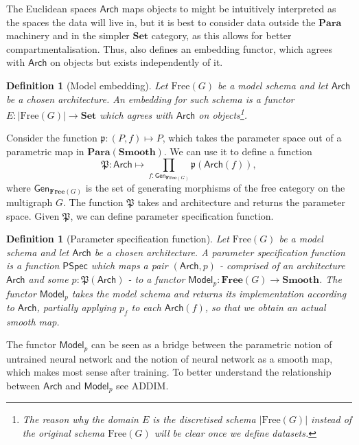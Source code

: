 \documentclass[12pt,a4paper,openright,twoside]{report}
\theoremstyle{plain}
\newtheorem{definition}[proposition]{Definition}
\theoremstyle{definition}
\begin{document}
The Euclidean spaces $\mathsf{Arch}$ maps objects to might be intuitively interpreted as the spaces the data will live in, but it is best to consider data outside the $\mathbf{Para}$ machinery and in the simpler $\mathbf{Set}$ category, as this allows for better compartmentalisation. Thus, \cite{gavranovic2019compositional} also defines an embedding functor, which agrees with $\mathsf{Arch}$ on objects but exists independently of it.


\begin{definition}[Model embedding]
  Let $\mathrm{Free}(G)$ be a model schema and let $\mathsf{Arch}$ be a chosen architecture. An embedding for such schema is a functor $E: |\mathrm{Free}(G)| \to \mathbf{Set}$ which agrees with $\mathsf{Arch}$ on objects\footnote{The reason why the domain $E$ is the discretised schema $|\mathrm{Free}(G)|$ instead of the original schema $\mathrm{Free}(G)$ will be clear once we define datasets.}.
\end{definition}

Consider the function $\mathfrak{p}: (P,f) \mapsto P$, which takes the parameter space out of a parametric map in $\mathbf{Para}(\mathbf{Smooth})$. We can use it to define a function 
\[\mathfrak{P}: \mathsf{Arch} \mapsto \prod_{f : \mathsf{Gen}_{\mathbf{Free}(G)}}\mathfrak{p}(\mathsf{Arch}(f)),\]
where $\mathsf{Gen}_{\mathbf{Free}(G)}$ is the set of generating morphisms of the free category on the multigraph $G$. The function $\mathfrak{P}$ takes and architecture and returns the parameter space. Given $\mathfrak{P}$, we can define parameter specification function.

\begin{definition}[Parameter specification function]
  Let $\mathrm{Free}(G)$ be a model schema and let $\mathsf{Arch}$ be a chosen architecture. A parameter specification function is a function $\mathsf{PSpec}$ which maps a pair $(\mathsf{Arch}, p)$ - comprised of an architecture $\mathsf{Arch}$ and some $p : \mathfrak{P}(\mathsf{Arch})$ - to a functor $\mathsf{Model}_p: \mathbf{Free}(G) \to \mathbf{Smooth}$. The functor $\mathsf{Model}_p$ takes the model schema and returns its implementation according to $\mathsf{Arch}$, partially applying $p_f$ to each $\mathsf{Arch}(f)$, so that we obtain an actual smooth map. 
\end{definition}

The functor $\mathsf{Model}_p$ can be seen as a bridge between the parametric notion of untrained neural network and the notion of neural network as a smooth map, which makes most sense after training. To better understand the relationship between $\mathsf{Arch}$ and $\mathsf{Model}_p$ see ADDIM.
\end{document}
